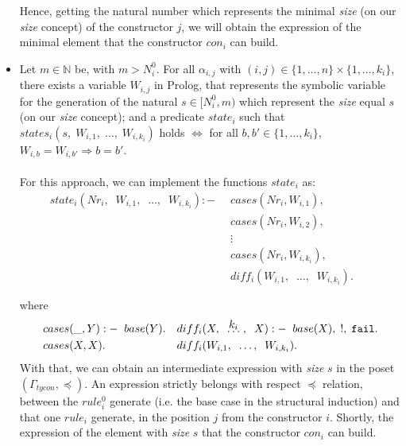 \documentclass{report}
\theoremstyle{definition}
\theoremstyle{definition}
\newcommand{\ttt}[1]{\texttt{#1}}
\newcommand{\tav}{\;\;}
\newcommand{\kldots}[1]{\stackrel{\mathclap{\normalfont\mbox{#1}}}{\ldots}}
\begin{document}
\begin{itemize}
	      Hence, getting the natural number which represents the minimal \textit{size} (on our \textit{size} concept) of the constructor $j$, we will obtain the expression of the minimal element that the constructor $con_i$ can build.
	\item Let $m \in \mathbb{N}$ be, with $m > N_{i}^{0}$. For all $\alpha_{i,j}$ with $(i,j) \in \{1, \ldots, n \} \times \{1, \ldots, k_i \}$, there exists a variable $W_{i,j}$ in Prolog, that represents the symbolic variable for the generation of the natural $s \in [N_{i}^{0}, m )$ which represent the \textit{size} equal $s$ (on our \textit{size} concept); and a predicate $state_{i}$ such that $states_i(s, \; W_{i,1}, \; \ldots, \; W_{i,k_i})$ holds $\Longleftrightarrow $ for all $b,b' \in \{1, \ldots, k_i \}$,  $W_{i,b}=W_{i,b'} \Rightarrow b = b'$.\\\\
		      For this approach, we can implement the functions $state_i$ as:
		      \begin{align*}
		      	state_i(Nr_i, \tav W_{i,1}, \tav \ldots, \tav W_{i, k_i}) :-
		      	  & \tav cases(Nr_i, W_{i,1}),                          &   &   \\
		      	  & \tav cases(Nr_i, W_{i,2}),                          &   &   \\
		      	  & \tav \vdots                                         &   &   \\
		      	  & \tav cases(Nr_i, W_{i,k_i}),                        &   &   \\
		      	  & \tav diff_i(W_{i,1}, \tav \ldots, \tav W_{i, k_i}). &   &   \\\\
		      \end{align*}
		      where
		      \begin{align*}
		      	  & cases(\_, Y) :- \tav base(Y). &   & diff_i(X, \tav \kldots{$k_i$}\;, \tav X) :- \tav base(X), \; !, \; \ttt{fail}. \\
		      	  & cases(X, X).                  &   & diff_i(W_{i,1}, \tav \ldots, \tav W_{i, k_i}).                                 
		      \end{align*}
		      With that, we can obtain an intermediate expression with \textit{size} $s$ in the poset $(\Gamma_{tycon}, \preceq)$. An expression strictly belongs with respect $\preceq$ relation, between the $rule_{i}^{0}$ generate (i.e. the base case in the structural induction) and that one $rule_i$ generate, in the position $j$ from the constructor $i$. Shortly, the expression of the element with \textit{size} $s$ that the constructor $con_i$ can build.
	\end{itemize}
\end{document}

